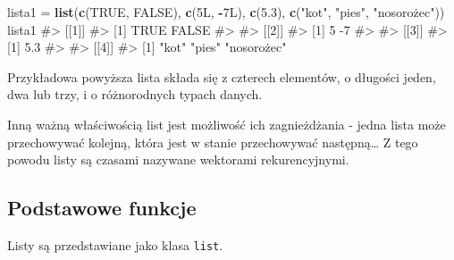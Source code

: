 \documentclass[paper=6in:9in,pagesize=pdftex,headinclude=on,footinclude=on,10pt]{scrbook}
\newenvironment{Shaded}{\begin{snugshade}}{\end{snugshade}}
\newcommand{\CommentTok}[1]{\textcolor[rgb]{0.56,0.35,0.01}{\textit{#1}}}
\newcommand{\FloatTok}[1]{\textcolor[rgb]{0.00,0.00,0.81}{#1}}
\newcommand{\KeywordTok}[1]{\textcolor[rgb]{0.13,0.29,0.53}{\textbf{#1}}}
\newcommand{\NormalTok}[1]{#1}
\newcommand{\OperatorTok}[1]{\textcolor[rgb]{0.81,0.36,0.00}{\textbf{#1}}}
\newcommand{\OtherTok}[1]{\textcolor[rgb]{0.56,0.35,0.01}{#1}}
\newcommand{\StringTok}[1]{\textcolor[rgb]{0.31,0.60,0.02}{#1}}
\begin{document}
\begin{Shaded}
\begin{Highlighting}[]
\NormalTok{lista1 =}\StringTok{ }\KeywordTok{list}\NormalTok{(}\KeywordTok{c}\NormalTok{(}\OtherTok{TRUE}\NormalTok{, }\OtherTok{FALSE}\NormalTok{), }
              \KeywordTok{c}\NormalTok{(5L, }\OperatorTok{-}\NormalTok{7L),}
              \KeywordTok{c}\NormalTok{(}\FloatTok{5.3}\NormalTok{), }
              \KeywordTok{c}\NormalTok{(}\StringTok{"kot"}\NormalTok{, }\StringTok{"pies"}\NormalTok{, }\StringTok{"nosorożec"))}
\StringTok{lista1}
\StringTok{#> [[1]]}
\StringTok{#> [1]  TRUE FALSE}
\StringTok{#> }
\StringTok{#> [[2]]}
\StringTok{#> [1]  5 -7}
\StringTok{#> }
\StringTok{#> [[3]]}
\StringTok{#> [1] 5.3}
\StringTok{#> }
\StringTok{#> [[4]]}
\StringTok{#> [1] "}\NormalTok{kot}\StringTok{"       "}\NormalTok{pies}\StringTok{"      "}\NormalTok{nosorożec"}
\end{Highlighting}
\end{Shaded}

Przykładowa powyższa lista składa się z czterech elementów, o długości jeden, dwa lub trzy, i o różnorodnych typach danych.

Inną ważną właściwością list jest możliwość ich zagnieżdżania - jedna lista może przechowywać kolejną, która jest w stanie przechowywać następną\ldots{} Z tego powodu listy są czasami nazywane wektorami rekurencyjnymi.

\begin{Shaded}
\end{Shaded}

\hypertarget{podstawowe-funkcje-2}{%
\subsection{Podstawowe funkcje}\label{podstawowe-funkcje-2}}

Listy są przedstawiane jako klasa \texttt{list}.
\end{document}
